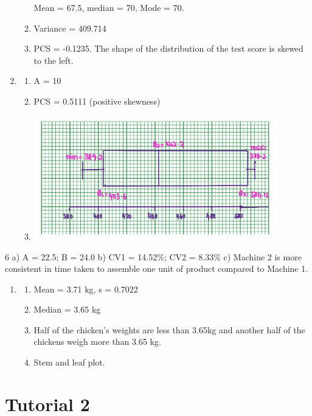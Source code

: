\documentclass[
  a4paper,
  DIV=11,
  numbers=noendperiod,
  oneside]{scrreprt}
\providecommand{\tightlist}{%
  \setlength{\itemsep}{0pt}\setlength{\parskip}{0pt}}\usepackage{longtable,booktabs,array}
\begin{document}
\begin{enumerate}
\begin{enumerate}
    Mean = 67.5, median = 70, Mode = 70.
  \item
    Variance = 409.714
  \item
    PCS = -0.1235. The shape of the distribution of the test score is
    skewed to the left.
  \end{enumerate}
\item
  \begin{enumerate}
  \def\labelenumii{\alph{enumii})}
  \tightlist
  \item
    A = 10
  \item
    PCS = 0.5111 (positive skewness)
  \item
    \includegraphics[width=4.16667in,height=\textheight]{images/ch2/picture26.png}
  \end{enumerate}
\end{enumerate}

6 a) A = 22.5; B = 24.0 b) CV1 = 14.52\%; CV2 = 8.33\% c) Machine 2 is
more consistent in time taken to assemble one unit of product compared
to Machine 1.

\begin{enumerate}
\def\labelenumi{\arabic{enumi}.}
\setcounter{enumi}{6}
\item
  \begin{enumerate}
  \def\labelenumii{\alph{enumii})}
  \tightlist
  \item
    Mean = 3.71 kg, s = 0.7022
  \item
    Median = 3.65 kg
  \item
    Half of the chicken's weights are less than 3.65kg and another half
    of the chickens weigh more than 3.65 kg.
  \item
    Stem and leaf plot.
  \end{enumerate}
\end{enumerate}

\hypertarget{tutorial-2}{%
\section{Tutorial 2}\label{tutorial-2}}
\end{document}

